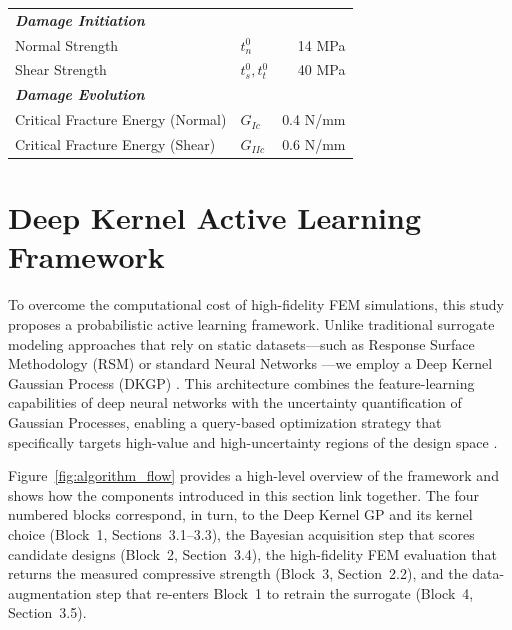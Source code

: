 \documentclass[
  preprint,
  12pt,
  a4paper
]{elsarticle}
\newcommand{\new}[1]{#1}
\begin{document}
\begin{table}[htbp]
\begin{tabular}{l l r}
        \textit{\textbf{Damage Initiation}} & & \\
        Normal Strength & $t_n^0$ & 14 MPa \\
        Shear Strength & $t_s^0, t_t^0$ & 40 MPa \\
        
        \textit{\textbf{Damage Evolution}} & & \\
        Critical Fracture Energy (Normal) & $G_{Ic}$ & \new{0.4 N/mm} \\
        Critical Fracture Energy (Shear) & $G_{IIc}$ & \new{0.6 N/mm} \\
        \bottomrule
    \end{tabular}
\end{table}

\section{Deep Kernel Active Learning Framework}
\label{sec:AI_framework}

To overcome the computational cost of high-fidelity FEM simulations, this study proposes a probabilistic active learning framework. Unlike traditional surrogate modeling approaches that rely on static datasets—such as Response Surface Methodology (RSM) or standard Neural Networks \cite{queipo2005surrogate, luo2020surrogate}—we employ a Deep Kernel Gaussian Process (DKGP) \cite{wilson2016deep}. This architecture combines the feature-learning capabilities of deep neural networks with the uncertainty quantification of Gaussian Processes, enabling a query-based optimization strategy that specifically targets high-value and high-uncertainty regions of the design space \cite{ghosh2023digital}.

\new{Figure~\ref{fig:algorithm_flow} provides a high-level overview of the framework and shows how the components introduced in this section link together. The four numbered blocks correspond, in turn, to the Deep Kernel GP and its kernel choice (Block~1, Sections~3.1--3.3), the \new{Bayesian acquisition step that scores} candidate designs (Block~2, Section~3.4), the high-fidelity FEM evaluation that returns the measured compressive strength (Block~3, Section~2.2), and the data-augmentation step that re-enters Block~1 to retrain the surrogate (Block~4, Section~3.5).}
\end{document}
